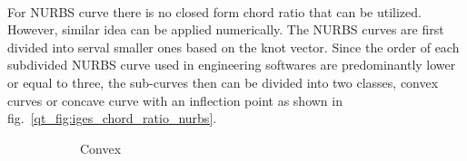 \paragraph{}
For NURBS curve there is no closed form chord ratio that can be utilized.
However, similar idea can be applied numerically.
The NURBS curves are first divided into serval smaller ones based on the knot vector.  %
Since the order of each subdivided NURBS curve used in engineering softwares are predominantly lower or equal to three, the sub-curves then can be divided into two classes, convex curves or concave curve with an inflection point as shown in fig.~\ref{qt_fig:iges_chord_ratio_nurbs}.
    \begin{figure}
        \begin{subfigure}[b]{0.5\linewidth}
            \centering
            \caption{Convex}
        \end{subfigure}
        \begin{subfigure}[b]{0.5\linewidth}
            \centering
\end{subfigure}
\end{figure}
